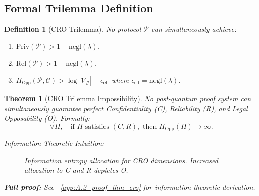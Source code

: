 \documentclass[preprint,12pt]{elsarticle}
\newtheorem{definition}{Definition}[section]
\newtheorem{theorem}{Theorem}[section]
\newcommand{\negl}{\mathrm{negl}}
\begin{document}
        \subsection{Formal Trilemma Definition}
            \begin{definition}[CRO Trilemma]\label{def:cro_trilemma}
                No protocol $\mathcal{P}$ can simultaneously achieve:
                \begin{enumerate}
                    \item $\mathrm{Priv}(\mathcal{P}) > 1 - \negl(\lambda)$.
                    \item $\mathrm{Rel}(\mathcal{P}) > 1 - \negl(\lambda)$.
                    \item $H_{\mathsf{Opp}}(\mathcal{P}, \mathcal{C}) > \log |\mathcal{V}_{\mathcal{J}}| - \epsilon_{\text{eff}}$ where $\epsilon_{\text{eff}} = \negl(\lambda)$.
                \end{enumerate}
            \end{definition}
            \begin{theorem}[CRO Trilemma Impossibility]\label{thm:cro}
                No post-quantum proof system can simultaneously guarantee perfect Confidentiality (C), Reliability (R), and Legal Opposability (O). Formally:
                \begin{equation}\label{eq:cro}
                    \forall \Pi,\quad \text{if } \Pi \text{ satisfies } (C, R), \text{ then } H_{\text{Opp}}(\Pi) \to \infty.
                \end{equation}
                
                \textit{Information-Theoretic Intuition:} 
                    \begin{figure}[H]
                        \centering
                        \caption{Information entropy allocation for CRO dimensions. Increased allocation to C and R depletes O.}
                        \label{fig:entropy_allocation}
                    \end{figure}

                \textbf{Full proof:} See ~\ref{app:A.2_proof_thm_cro} for information-theoretic derivation.
            \end{theorem}
\end{document}
